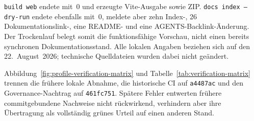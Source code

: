 \texttt{build web} endete mit~0 und erzeugte Vite-Ausgabe sowie ZIP.
\texttt{docs index --dry-run} endete ebenfalls mit~0, meldete aber zehn
Index-, 26 Dokumentationslink-, eine README- und eine
AGENTS-Backlink-Änderung. Der Trockenlauf belegt somit die funktionsfähige
Vorschau, nicht einen bereits synchronen Dokumentationsstand. Alle lokalen
Angaben beziehen sich auf den 22.~August~2026; technische Quelldateien wurden
dabei nicht geändert.

Abbildung~\ref{fig:profile-verification-matrix} und
Tabelle~\ref{tab:verification-matrix} trennen die frühere lokale Abnahme, die
historische CI auf \texttt{a4487ac} und den Governance-Nachtrag auf
\texttt{461fc751}. Spätere Fehler entwerten frühere commitgebundene Nachweise
nicht rückwirkend, verhindern aber ihre Übertragung als vollständig grünes
Urteil auf einen anderen Stand.



